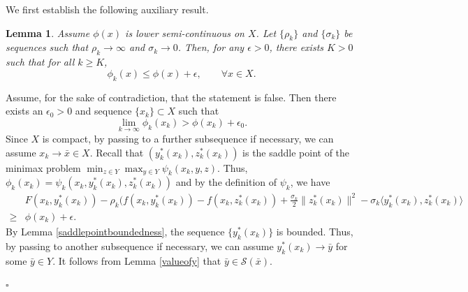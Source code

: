 \documentclass{article}
\newtheorem{lemma}[theorem]{Lemma}
\newenvironment{proof}[1][Proof]{\par
	\normalfont\topsep6pt\relax
	\trivlist\item[\hskip\labelsep\itshape #1.]\ignorespaces
}{%
	\hfill\ensuremath{\square}\endtrivlist
}
\begin{document}
We first establish the following auxiliary result. \begin{lemma}\label{lemb11}
     Assume $\phi(x)$ is lower semi-continuous on $X$. Let $\{\rho_k\}$ and $\{\sigma_k\}$ be sequences such that $\rho_k \rightarrow \infty$ and $\sigma_k \rightarrow 0$. Then, for any $\epsilon > 0$, there exists $K > 0$ such that for all $k \ge K$,
     \begin{equation}\label{}
         	 	\phi_{k}(x)\le\phi(x) + \epsilon, \qquad \forall x \in X.
     \end{equation}
	 \end{lemma}
\begin{proof}
     Assume, for the sake of contradiction, that the statement is false. Then there exists an $\epsilon_0 > 0$ and sequence $\{x_k\} \subset X$ such that
     \begin{equation*}
         	 	\lim\limits_{k\to\infty} \phi_{k}(x_k) > \phi(x_k) + \epsilon_0.
     \end{equation*}
     Since $X$ is compact, by passing to a further subsequence if necessary, we can assume $x_k \rightarrow \bar{x} \in X$.  
     Recall that $(y_k^*(x_k), z_k^*(x_k))$ is the saddle point of the minimax problem $\min_{z\in {Y}} \max_{ y \in {Y}}\psi_{k}(x_k, y, z)$. Thus, $\phi_{k}(x_k) = \psi_k (x_k,y_k^*(x_k), z_k^*(x_k))$ and by the definition of $\psi_k$, we have
     \begin{equation}\label{lemb21_eq1}
     \begin{aligned}
         &F(x_k, y_k^*(x_k) ) - \rho_k( f(x_k, y_k^*(x_k) ) - f(x_k, z_k^*(x_k) ) + \frac{\sigma_k}{2}\| z_k^*(x_k) \|^2 - \sigma_k \langle y_k^*(x_k) , z_k^*(x_k) \rangle \\
     \ge &\phi(x_k) + \epsilon.
     \end{aligned}
     \end{equation}
	By Lemma \ref{saddlepointboundedness}, the sequence $\{y_k^*(x_k)\}$ is bounded. Thus, by passing to another subsequence if necessary, we can assume $y_k^*(x_k) \rightarrow \bar{y}$ for some $\bar{y} \in Y$. It follows from Lemma \ref{valueofy} that $\bar{y} \in \mathcal{S}(\bar{x})$.


\end{proof}
\end{document}
